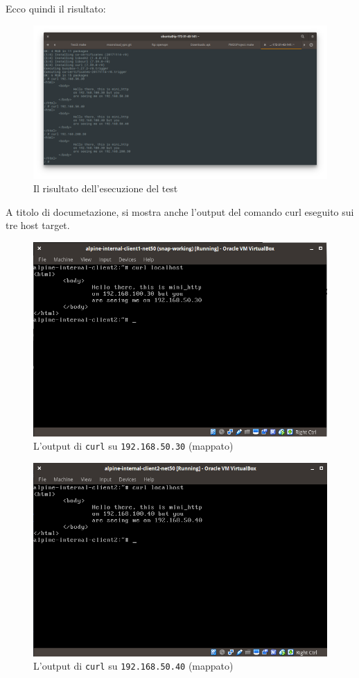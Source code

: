 Ecco quindi il risultato:
\begin{figure}[h]
  \includegraphics[scale=0.35]{img/test1-result}
  \caption{Il risultato dell'esecuzione del test}
  \label{fig:test1-result}
\end{figure}
A titolo di documetazione, si mostra anche l'output del comando curl eseguito
sui tre host target.
\begin{figure}
  \includegraphics[scale=0.4]{img/alpine-internal-client1-net50}
  \caption[Output di curl su target 1 in \texttt{net50}]
  {L'output di \texttt{curl} su \texttt{192.168.50.30} (mappato)}
  \label{fig:alpine-internal-client1-net50}
\end{figure}
\begin{figure}
  \includegraphics[scale=0.4]{img/alpine-internal-client2-net50}
  \caption[Output di curl su target 2 in \texttt{net50}]
  {L'output di \texttt{curl} su \texttt{192.168.50.40} (mappato)}
  \label{fig:alpine-internal-client2-net50}
\end{figure}
